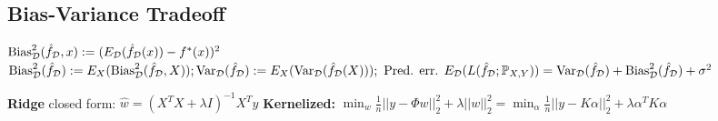 \subsection*{Bias-Variance Tradeoff}
\(\text{Bias}_{\mathcal{D}}^2(\hat{f}_{\mathcal{D}}, x) := (E_{\mathcal{D}}(\hat{f}_{\mathcal{D}}(x))-f^*(x))^2\)\\
\(\text{Bias}^2_{\mathcal{D}}(\hat{f}_{\mathcal{D}}) := E_X(\text{Bias}_{\mathcal{D}}^2(\hat{f}_{\mathcal{D}}, X));
\text{Var}_{\mathcal{D}}(\hat{f}_{\mathcal{D}}) := E_X(\text{Var}_{\mathcal{D}}(\hat{f}_{\mathcal{D}}(X)));\text{ Pred. err. } 
E_{\mathcal{D}}(L(\hat{f}_{\mathcal{D}}; \mathbb{P}_{X,Y})) = \text{Var}_{\mathcal{D}}(\hat{f}_{\mathcal{D}})+\text{Bias}_{\mathcal{D}}^2(\hat{f}_{\mathcal{D}})+\sigma^2\)

\textbf{Ridge} closed form: $\hat{w}=(X^T X + \lambda I)^{-1} X^T y$
\textbf{Kernelized: } \(\min_w \frac{1}{n}||y-\Phi w||_2^2+ \lambda||w||_2^2 = 
\min_{\alpha}\frac{1}{n}||y-K\alpha||_2^2+\lambda\alpha^TK\alpha\)







